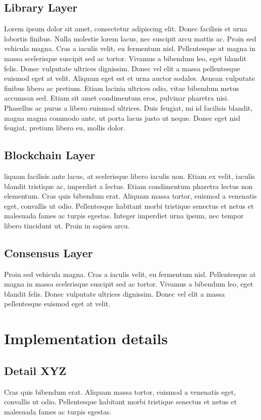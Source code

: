 \documentclass[runningheads]{llncs}
\begin{document}
\subsection{Library Layer}
Lorem ipsum dolor sit amet, consectetur adipiscing elit. Donec facilisis et urna lobortis finibus. Nulla molestie lorem lacus, nec suscipit arcu mattis ac. Proin sed vehicula magna. Cras a iaculis velit, eu fermentum nisl. Pellentesque at magna in massa scelerisque suscipit sed ac tortor. Vivamus a bibendum leo, eget blandit felis. Donec vulputate ultrices dignissim. Donec vel elit a massa pellentesque euismod eget at velit. Aliquam eget est et urna auctor sodales. Aenean vulputate finibus libero ac pretium. Etiam lacinia ultrices odio, vitae bibendum metus accumsan sed. Etiam sit amet condimentum eros, pulvinar pharetra nisi. Phasellus ac purus a libero euismod ultrices. Duis feugiat, mi id facilisis blandit, magna magna commodo ante, ut porta lacus justo ut neque. Donec eget nisl feugiat, pretium libero eu, mollis dolor.
%
\subsection{Blockchain Layer}
liquam facilisis ante lacus, at scelerisque libero iaculis non. Etiam ex velit, iaculis blandit tristique ac, imperdiet a lectus. Etiam condimentum pharetra lectus non elementum. Cras quis bibendum erat. Aliquam massa tortor, euismod a venenatis eget, convallis ut odio. Pellentesque habitant morbi tristique senectus et netus et malesuada fames ac turpis egestas. Integer imperdiet urna ipsum, nec tempor libero tincidunt ut. Proin in sapien arcu.
%
\subsection{Consensus Layer}
Proin sed vehicula magna. Cras a iaculis velit, eu fermentum nisl. Pellentesque at magna in massa scelerisque suscipit sed ac tortor. Vivamus a bibendum leo, eget blandit felis. Donec vulputate ultrices dignissim. Donec vel elit a massa pellentesque euismod eget at velit.
%
\section{Implementation details}
\subsection{Detail XYZ}
Cras quis bibendum erat. Aliquam massa tortor, euismod a venenatis eget, convallis ut odio. Pellentesque habitant morbi tristique senectus et netus et malesuada fames ac turpis egestas.
%
\end{document}
